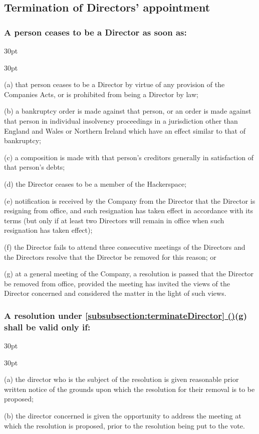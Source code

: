 \documentclass[12pt]{article}
\newcommand*{\fancyref}[1]{\hyperref[{#1}]{\autoref*{#1} (\nameref*{#1})}}
\def\clauseindent{30pt}
\newenvironment{subindentlist}{\begin{adjustwidth}{\clauseindent}{}\begin{labeledlist}{\clauseindent}}{\end{labeledlist}\end{adjustwidth}}
\begin{document}
\subsection{Termination of Directors' appointment}
\subsubsection[Automatic termination of Directors]{A person ceases to be a Director as soon as:}\label{subsubsection:terminateDirector}
\begin{subindentlist}
    \item [(a)] that person ceases to be a Director by virtue of any provision of the Companies Acts, or is prohibited from being a Director by law;
    \item [(b)] a bankruptcy order is made against that person, or an order is made against that person in individual insolvency proceedings in a jurisdiction other than England and Wales or Northern Ireland which have an effect similar to that of bankruptcy;
    \item [(c)] a composition is made with that person's creditors generally in satisfaction of that person's debts;
    \item [(d)] the Director ceases to be a member of the Hackerspace;
    \item [(e)] notification is received by the Company from the Director that the Director is resigning from office, and such resignation has taken effect in accordance with its terms (but only if at least two Directors will remain in office when such resignation has taken effect);
    \item [(f)] the Director fails to attend three consecutive meetings of the Directors and the Directors resolve that the Director be removed for this reason; or
    \item [(g)] at a general meeting of the Company, a resolution is passed that the Director be removed from office, provided the meeting has invited the views of the Director concerned and considered the matter in the light of such views.
\end{subindentlist}
\subsubsection[Specifics of resolution to terminate a Director]{A resolution under \fancyref{subsubsection:terminateDirector}(g) shall be valid only if:}
\begin{subindentlist}
    \item [(a)] the director who is the subject of the resolution is given reasonable prior written notice of the grounds upon which the resolution for their removal is to be proposed;
    \item [(b)] the director concerned is given the opportunity to address the meeting at which the resolution is proposed, prior to the resolution being put to the vote.
\end{subindentlist}
\end{document}
